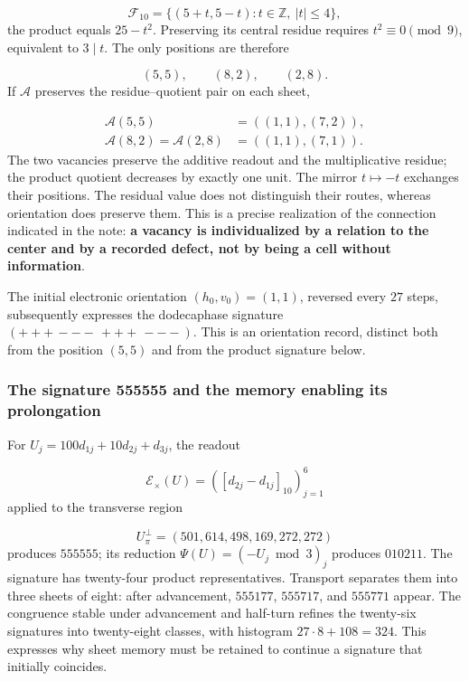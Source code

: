 \[
\mathcal F_{10}=\{(5+t,5-t):t\in\mathbb Z,\ |t|\leq4\},
\]
the product equals \(25-t^2\). Preserving its central residue requires \(t^2\equiv0\pmod9\), equivalent to \(3\mid t\). The only positions are therefore

\[
(5,5),\qquad(8,2),\qquad(2,8).
\]
If \(\mathcal A\) preserves the residue–quotient pair on each sheet,

\[
\begin{aligned}
\mathcal A(5,5)&=((1,1),(7,2)),\\
\mathcal A(8,2)=\mathcal A(2,8)&=((1,1),(7,1)).
\end{aligned}
\]
The two vacancies preserve the additive readout and the multiplicative residue; the product quotient decreases by exactly one unit. The mirror \(t\mapsto-t\) exchanges their positions. The residual value does not distinguish their routes, whereas orientation does preserve them. This is a precise realization of the connection indicated in the note: \textbf{a vacancy is individualized by a relation to the center and by a recorded defect, not by being a cell without information}.

The initial electronic orientation \((h_0,v_0)=(1,1)\), reversed every \(27\) steps, subsequently expresses the dodecaphase signature \((+++\,---\,+++\,---)\). This is an orientation record, distinct both from the position \((5,5)\) and from the product signature below.

\subsubsection*{The signature 555555 and the memory enabling its prolongation}
For \(U_j=100d_{1j}+10d_{2j}+d_{3j}\), the readout

\[
\mathcal E_\times(U)=([d_{2j}-d_{1j}]_{10})_{j=1}^{6}
\]
applied to the transverse region

\[
U_\pi^\perp=(501,614,498,169,272,272)
\]
produces \(555555\); its reduction \(\Psi(U)=(-U_j\bmod3)_j\) produces \(010211\). The signature has twenty-four product representatives. Transport separates them into three sheets of eight: after advancement, \(555177\), \(555717\), and \(555771\) appear. The congruence stable under advancement and half-turn refines the twenty-six signatures into twenty-eight classes, with histogram \(27\cdot8+108=324\). This expresses why sheet memory must be retained to continue a signature that initially coincides.



